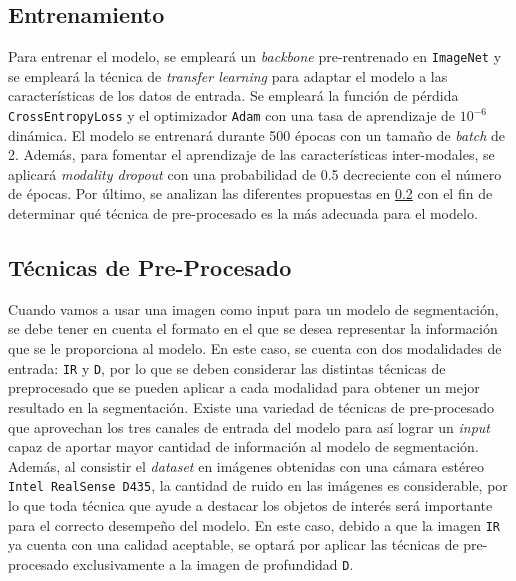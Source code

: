 \documentclass[12pt,a4paper]{report}
\begin{document}
\subsection{Entrenamiento}
\label{subsec:training}
Para entrenar el modelo, se empleará un \textit{backbone} pre-rentrenado en \texttt{ImageNet} y se empleará la técnica de \textit{transfer learning} para adaptar el modelo a las características de los datos de entrada. Se empleará la función de pérdida \texttt{CrossEntropyLoss} y el optimizador \texttt{Adam} con una tasa de aprendizaje de $10^{-6}$ dinámica. El modelo se entrenará durante 500 épocas con un tamaño de \textit{batch} de 2. Además, para fomentar el aprendizaje de las características inter-modales, se aplicará \textit{modality dropout} con una probabilidad de 0.5 decreciente con el número de épocas. Por último, se analizan las diferentes propuestas en \ref{subsec:tecnicas_post_procesado} con el fin de determinar qué técnica de pre-procesado es la más adecuada para el modelo.


\subsection{Técnicas de Pre-Procesado}
\label{subsec:tecnicas_post_procesado}
Cuando vamos a usar una imagen como input para un modelo de segmentación, se debe tener en cuenta el formato en el que se desea representar la información que se le proporciona al modelo. En este caso, se cuenta con dos modalidades de entrada: \texttt{IR} y \texttt{D}, por lo que se deben considerar las distintas técnicas de preprocesado que se pueden aplicar a cada modalidad para obtener un mejor resultado en la segmentación.
Existe una variedad de técnicas de pre-procesado que aprovechan los tres canales de entrada del modelo para así lograr un \textit{input} capaz de aportar mayor cantidad de información al modelo de segmentación. Además, al consistir el \textit{dataset} en imágenes obtenidas con una cámara estéreo \texttt{Intel RealSense D435}, la cantidad de ruido en las imágenes es considerable, por lo que toda técnica que ayude a destacar los objetos de interés será importante para el correcto desempeño del modelo. En este caso, debido a que la imagen \texttt{IR} ya cuenta con una calidad aceptable, se optará por aplicar las técnicas de pre-procesado exclusivamente a la imagen de profundidad \texttt{D}.
\end{document}
